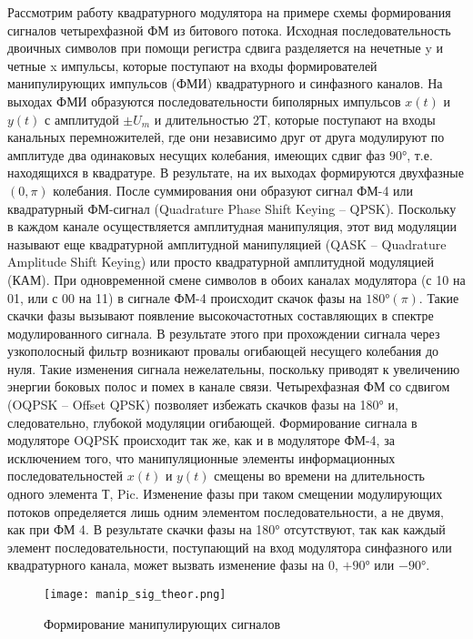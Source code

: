 Рассмотрим работу квадратурного модулятора на примере схемы формирования сигналов четырехфазной ФМ из битового потока. Исходная последовательность двоичных символов при помощи регистра сдвига разделяется на нечетные y и четные x импульсы, которые поступают на входы формирователей манипулирующих импульсов (ФМИ) квадратурного и синфазного каналов. На выходах ФМИ образуются последовательности биполярных импульсов $x(t)$ и $y(t)$ с амплитудой $\pm U_m$ и длительностью $2Т$, которые поступают на входы канальных перемножителей, где они независимо друг от друга модулируют по амплитуде два одинаковых несущих колебания, имеющих сдвиг фаз $90°$, т.е. находящихся в квадратуре. В результате, на их выходах формируются двухфазные $(0, \pi)$ колебания.
После суммирования они образуют сигнал ФМ-4 или квадратурный ФМ-сигнал (Quadrature Phase Shift Keying – QPSK). Поскольку в каждом канале осуществляется амплитудная манипуляция, этот вид модуляции называют еще квадратурной амплитудной манипуляцией (QASK – Quadrature Amplitude Shift Keying) или просто квадратурной амплитудной модуляцией (КАМ). При одновременной смене символов в обоих каналах модулятора (с 10 на 01, или с 00 на 11) в сигнале ФМ-4 происходит скачок фазы на $180° (\pi)$. Такие скачки фазы вызывают появление высокочастотных составляющих в спектре модулированного сигнала. В результате этого при прохождении сигнала через узкополосный фильтр возникают провалы огибающей несущего колебания до нуля. Такие изменения сигнала нежелательны, поскольку приводят к увеличению энергии боковых полос и помех в канале связи.
Четырехфазная ФМ со сдвигом (OQPSK – Offset QPSK) позволяет избежать скачков фазы на 180° и, следовательно, глубокой модуляции огибающей. Формирование сигнала в модуляторе OQPSK происходит так же, как и в модуляторе ФМ-4, за исключением того, что манипуляционные элементы информационных последовательностей $x(t)$ и $y(t)$ смещены во времени на длительность одного элемента $Т$, Pic. Изменение фазы при таком смещении модулирующих потоков определяется лишь одним элементом последовательности, а не двумя, как при ФМ 4. В результате скачки фазы на 180° отсутствуют, так как каждый элемент последовательности, поступающий на вход модулятора синфазного или квадратурного канала, может вызвать изменение фазы на $0$, $+90°$ или $-90°$.
\begin{figure}[H]
	\begin{center}
		\texttt{[image: manip\_sig\_theor.png]}
		\caption{Формирование манипулирующих сигналов} %
		\label{manip_sig_theor} %
	\end{center}
\end{figure} 

